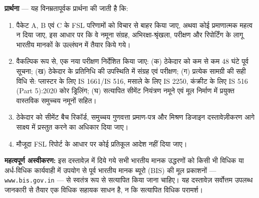\documentclass[12pt, a4paper]{article}
\begin{document}
\begin{prayerbox}
\textbf{प्रार्थना} --- यह विनम्रतापूर्वक प्रार्थना की जाती है कि:
\begin{enumerate}
  \item पैकेट A, B एवं C के FSL परिणामों को विचार से बाहर किया जाए, अथवा कोई प्रमाणात्मक महत्व न दिया जाए, इस आधार पर कि वे नमूना संग्रह, अभिरक्षा-श्रृंखला, परीक्षण और रिपोर्टिंग के लागू भारतीय मानकों के उल्लंघन में तैयार किये गये।
  \item वैकल्पिक रूप से, एक नया परीक्षण निर्देशित किया जाए: (क) ठेकेदार को कम से कम 48 घंटे पूर्व सूचना; (ख) ठेकेदार के प्रतिनिधि की उपस्थिति में संग्रह एवं परीक्षण; (ग) प्रत्येक सामग्री की सही विधि से: प्लास्टर के लिए IS 1661/IS 516, मसाले के लिए IS 2250, कंक्रीट के लिए IS 516 (Part 5):2020 कोर ड्रिलिंग; (घ) सत्यापित सीमेंट नियंत्रण नमूने एवं मूल निर्माण में प्रयुक्त वास्तविक समुच्चय नमूनों सहित।
  \item ठेकेदार को सीमेंट बैच रिकॉर्ड, समुच्चय गुणवत्ता प्रमाण-पत्र और मिश्रण डिजाइन दस्तावेज़ीकरण आगे साक्ष्य में प्रस्तुत करने का अधिकार दिया जाए।
  \item मौजूदा FSL रिपोर्ट के आधार पर कोई प्रतिकूल आदेश नहीं दिया जाए।
\end{enumerate}
\end{prayerbox}

\vspace{1cm}
\begin{mdframed}[linecolor=red!60, linewidth=1pt, backgroundcolor=lightred]
\textbf{महत्वपूर्ण अस्वीकरण:} इस दस्तावेज़ में दिये गये सभी भारतीय मानक उद्धरणों को किसी भी विधिक या अर्ध-विधिक कार्यवाही में उपयोग से पूर्व भारतीय मानक ब्यूरो (BIS) की मूल प्रकाशनों --- \texttt{www.bis.gov.in} --- से स्वतंत्र रूप से सत्यापित किया जाना चाहिए। यह दस्तावेज़ सर्वोत्तम उपलब्ध जानकारी से तैयार एक विधिक सहायक साधन है, न कि सत्यापित विधिक परामर्श।
\end{mdframed}
\end{document}

